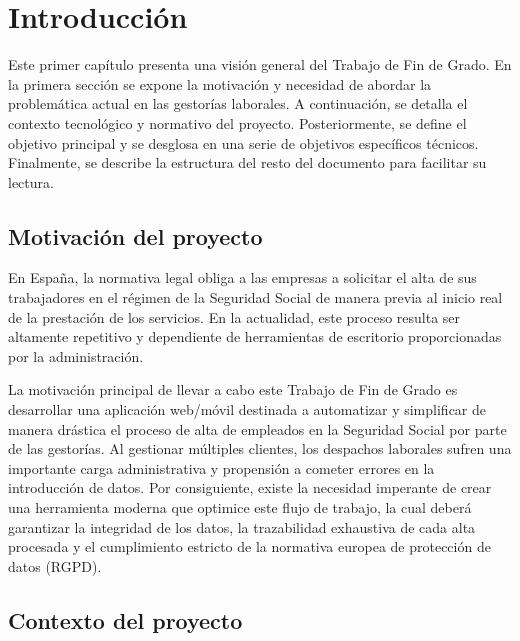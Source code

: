 \chapter{Introducción} \label{chp:intro}

Este primer capítulo presenta una visión general del Trabajo de Fin de Grado. En la primera sección se expone la motivación y necesidad de abordar la problemática actual en las gestorías laborales. A continuación, se detalla el contexto tecnológico y normativo del proyecto. Posteriormente, se define el objetivo principal y se desglosa en una serie de objetivos específicos técnicos. Finalmente, se describe la estructura del resto del documento para facilitar su lectura.


\section{Motivación del proyecto} \label{sct:intro:motivacion}

En España, la normativa legal obliga a las empresas a solicitar el alta de sus trabajadores en el régimen de la Seguridad Social de manera previa al inicio real de la prestación de los servicios. En la actualidad, este proceso resulta ser altamente repetitivo y dependiente de herramientas de escritorio proporcionadas por la administración. 

La motivación principal de llevar a cabo este Trabajo de Fin de Grado es desarrollar una aplicación web/móvil destinada a automatizar y simplificar de manera drástica el proceso de alta de empleados en la Seguridad Social por parte de las gestorías. Al gestionar múltiples clientes, los despachos laborales sufren una importante carga administrativa y propensión a cometer errores en la introducción de datos. Por consiguiente, existe la necesidad imperante de crear una herramienta moderna que optimice este flujo de trabajo, la cual deberá garantizar la integridad de los datos, la trazabilidad exhaustiva de cada alta procesada y el cumplimiento estricto de la normativa europea de protección de datos (RGPD).


\section{Contexto del proyecto} \label{sct:intro:contexto}

